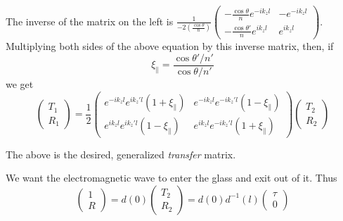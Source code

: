 \documentclass[twoside,10pt]{amsart}
\begin{document}
The inverse of the matrix on the left is $\frac{1}{ -2\left( \frac{ \cos{\theta}}{n} \right)} \left( \begin{matrix} -  \frac{ \cos{\theta}}{n} e^{ -i k_z l } & -e^{ -i k_z l } \\ - \frac{ \cos{\theta'}}{n } e^{ ik_z l } & e^{ik_z l } \end{matrix} \right)$.  Multiplying both sides of the above equation by this inverse matrix, then, if 
\[
\xi_{\parallel} = \frac{ \cos{\theta'}/n'}{  \cos{\theta}/n' } 
\]
we get
\[
\left( \begin{matrix} T_{1} \\ R_{1} \end{matrix} \right) = \frac{1}{2} \left( \begin{matrix} e^{ -ik_z l} e^{i k_z' l} (1+\xi_{\parallel} ) & e^{-ik_z l} e^{-ik_z' l} (1-\xi_{\parallel} ) \\ e^{ik_z l} e^{ik_z'l} (1- \xi_{\parallel}) & e^{ik_zl }e^{-ik_z'l} (1 + \xi_{\parallel}) \end{matrix} \right)\left( \begin{matrix} T_2 \\ R_2 \end{matrix} \right)
\]

The above is the desired, generalized \emph{transfer} matrix.  

We want the electromagnetic wave to enter the glass and exit out of it.  Thus
\[
\left( \begin{matrix} 1 \\ R \end{matrix} \right) = d(0) \left( \begin{matrix} T_{2} \\ R_{2} \end{matrix} \right) = d(0) d^{-1}(l) \left( \begin{matrix} \tau \\ 0 \end{matrix} \right)
\]
\end{document}
